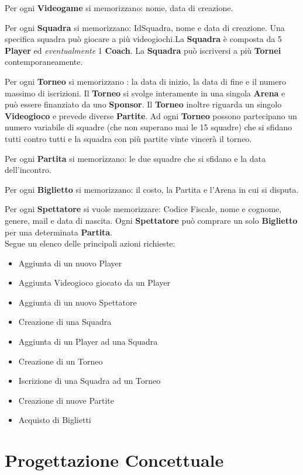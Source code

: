\documentclass[a4paper,12pt]{report}
\begin{document}
Per ogni \textbf{Videogame} si memorizzano: nome, data di creazione.

Per ogni \textbf{Squadra} si memorizzano: IdSquadra, nome e data di creazione. Una specifica squadra può giocare a più videogiochi.La \textbf{Squadra} è composta da 5 \textbf{Player} ed \textit{eventualmente} 1 \textbf{Coach}. La \textbf{Squadra} può iscriversi a più \textbf{Tornei} contemporaneamente.

Per ogni \textbf{Torneo} si memorizzano : la data di inizio, la data di fine e il numero massimo di iscrizioni. Il \textbf{Torneo} si svolge interamente in una singola \textbf{Arena} e può essere finanziato da uno \textbf{Sponsor}. Il \textbf{Torneo} inoltre riguarda un singolo \textbf{Videogioco} e prevede diverse \textbf{Partite}. Ad ogni \textbf{Torneo} possono partecipano un numero variabile di squadre (che non superano mai le 15 squadre) che si sfidano tutti contro tutti e la squadra con più partite vinte vincerà il torneo.

Per ogni \textbf{Partita} si memorizzano: le due squadre che si sfidano e la data dell'incontro.

Per ogni \textbf{Biglietto} si memorizzano: il costo, la Partita e l'Arena in cui si disputa.

Per ogni \textbf{Spettatore} si vuole memorizzare: Codice Fiscale, nome e cognome, genere, mail e data di nascita. Ogni \textbf{Spettatore} può comprare un solo \textbf{Biglietto} per una determinata \textbf{Partita}.\\

Segue un elenco delle principali azioni richieste:
\begin{itemize}
	\item Aggiunta di un nuovo Player
	\item Aggiunta Videogioco giocato da un Player
	\item Aggiunta di un nuovo Spettatore
	\item Creazione di una Squadra
	\item Aggiunta di un Player ad una Squadra
	\item Creazione di un Torneo
	\item Iscrizione di una Squadra ad un Torneo
	\item Creazione di nuove Partite
	\item Acquisto di Biglietti
\end{itemize}

\chapter{Progettazione Concettuale}
\end{document}
